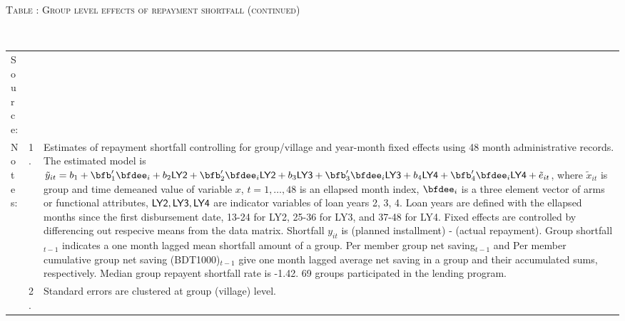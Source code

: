 \addtocounter{table}{-1}
\hspace{-1cm}\begin{minipage}[t]{14cm}
\hfil\textsc{\normalsize Table \thetable: Group level effects of repayment shortfall (continued)\label{tab shortfall group2}}\\
\setlength{\tabcolsep}{1pt}
\setlength{\baselineskip}{8pt}
\renewcommand{\arraystretch}{.6}
\hfil{}\\
\renewcommand{\arraystretch}{.8}
\setlength{\tabcolsep}{1pt}
\begin{tabular}{>{\hfill\scriptsize}p{1cm}<{}>{\hfill\scriptsize}p{.25cm}<{}>{\scriptsize}p{12cm}<{\hfill}}
Source:& \multicolumn{2}{l}{\scriptsize Estimated with GUK administrative data.}\\
Notes: & 1. & Estimates of repayment shortfall controlling for group/village and year-month fixed effects using 48 month administrative records. The estimated model is $\tilde{y}_{it}=b_{1}+\bfb'_{1}\bfdee_{i}+b_{2}\mbox{\textsf{LY2}}+\bfb'_{2}\bfdee_{i}\mbox{\textsf{LY2}}+b_{3}\mbox{\textsf{LY3}}+\bfb'_{3}\bfdee_{i}\mbox{\textsf{LY3}}+b_{4}\mbox{\textsf{LY4}}+\bfb'_{4}\bfdee_{i}\mbox{\textsf{LY4}}+\tilde{e}_{it}$, where $\tilde{x}_{it}$ is group and time demeaned value of variable $x$, $t=1,\dots, 48$ is an ellapsed month index, $\bfdee_{i}$ is a three element vector of arms or functional attributes, $\mbox{\textsf{LY2}}, \mbox{\textsf{LY3}}, \mbox{\textsf{LY4}}$ are indicator variables of loan years 2, 3, 4. Loan years are defined with the ellapsed months since the first disbursement date, 13-24 for \textsf{LY2}, 25-36 for \textsf{LY3}, and 37-48 for \textsf{LY4}. Fixed effects are controlled by differencing out respecive means from the data matrix. Shortfall $y_{it}$ is (planned installment) - (actual repayment). \textsf{Group shortfall}$_{t-1}$ indicates a one month lagged mean shortfall amount of a group. \textsf{Per member group net saving}$_{t-1}$ and \textsf{Per member cumulative group net saving (BDT1000)}$_{t-1}$ give one month lagged average net saving in a group and their accumulated sums, respectively. Median group repayent shortfall rate is -1.42. 69 groups participated in the lending program. \\
& 2. & Standard errors are clustered at group (village) level.
\end{tabular}
\end{minipage}

